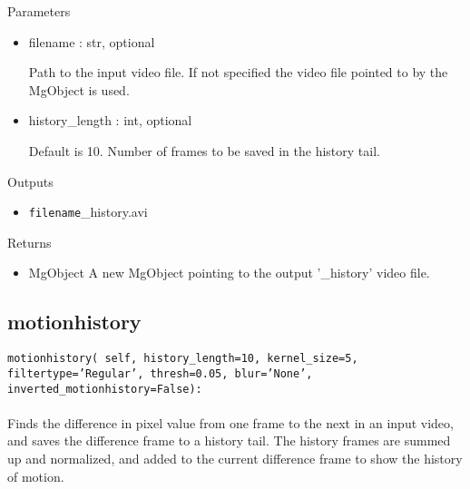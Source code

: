 \documentclass[9pt]{extarticle}
\def\code#1{\texttt{#1}}
\begin{document}
\noindent Parameters
\begin{itemize}
\item filename : str, optional

Path to the input video file. If not specified the video file 
pointed to by the MgObject is used.

\item history\_length : int, optional

Default is 10. Number of frames to be saved in the history tail.
\end{itemize}

\noindent Outputs
\begin{itemize}
\item \code{filename}\_history.avi
\end{itemize}

\noindent Returns
\begin{itemize}
\item MgObject 
A new MgObject pointing to the output '\_history' video file.
\end{itemize}


\subsection{motionhistory}

\code{motionhistory(
    self,
    history\_length=10,
    kernel\_size=5,
    filtertype='Regular',
    thresh=0.05,
    blur='None',
    inverted\_motionhistory=False):}
\\\\
Finds the difference in pixel value from one frame to the next in an input video, 
and saves the difference frame to a history tail. The history frames are summed up 
and normalized, and added to the current difference frame to show the history of 
motion. 
\\\\
\end{document}
